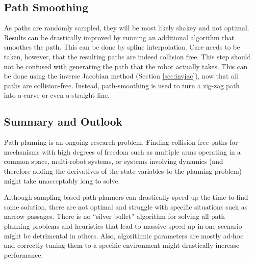 \subsection{Path Smoothing}
As paths are randomly sampled, they will be most likely shakey and not optimal. Results can be drastically improved by running an additional algorithm that smoothes the path. This can be done by spline interpolation. Care needs to be taken, however, that the resulting paths are indeed collision free. This step should not be confused with generating the path that the robot actually takes. This can be done using the inverse Jacobian method (Section \ref{sec:invjac}), now that all paths are collision-free. Instead, path-smoothing is used to turn a zig-zag path into a curve or even a straight line.

\subsection{Summary and Outlook}
Path planning is an ongoing research problem. Finding collision free paths for mechanisms with high degrees of freedom such as multiple arms operating in a common space, multi-robot systems, or systems involving dynamics (and therefore adding the derivatives of the state variables to the planning problem) might take unacceptably long to solve.

Although sampling-based path planners can drastically speed up the time to find some solution, there are not optimal and struggle with specific situations such as narrow passages. There is no ``silver bullet'' algorithm for solving all path planning problems and heuristics that lead to massive speed-up in one scenario might be detrimental in others. Also, algorithmic parameters are mostly ad-hoc and correctly tuning them to a specific environment might drastically increase performance.
 

